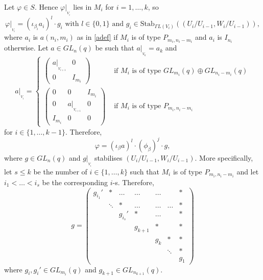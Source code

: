 Let $\varphi \in S$. Hence $\varphi|_{_{V_i}}$ lies in $M_i$ for $i=1, \ldots, k$, so $$\varphi|_{_{V_i}}= (\iota_{\beta_i} a_i)^l \cdot g_i \text{ with } l\in \{0,1\} \text{ and } g_i \in \mathrm{Stab}_{\Gamma L (V_i)}((U_{i}/U_{i-1}, W_{i}/U_{i-1})),$$
where $a_i$ is $a(n_i,m_i)$  as in \eqref{adef} if $M_i$ is of type $P_{m_i, n_i-m_i}$ and $a_i$ is $I_{n_i}$ otherwise. Let $a \in GL_n(q)$ be such that  $a|_{_{V_k}}=a_k$ and 
\begin{equation}
\label{adefGR}
a|_{_{V_i}}= \begin{cases}
\begin{pmatrix}
a|_{_{V_{i+1}}} & 0\\
0 & I_{m_{i}}
\end{pmatrix} &\text{ if } M_i \text{ is of type } GL_{m_i}(q) \oplus GL_{n_i-m_i}(q)\\
\begin{pmatrix}
0 & 0 & I_{m_i}\\
0 & a|_{_{V_{i+1}}} & 0\\
I_{m_i} & 0 & 0
\end{pmatrix} &\text{ if } M_i \text{ is of type } P_{m_i, n_i -m_i}
\end{cases}
\end{equation}
 for $i \in \{1, \ldots, k-1\}.$  Therefore, 
\begin{equation}
\label{GRvarphishape}
\varphi = (\iota_{\beta}a)^l \cdot (\phi_{\beta})^j \cdot g,
\end{equation}
where $g \in GL_n(q)$ and $g|_{_{V_i}}$ stabilises $(U_{i}/U_{i-1}, W_{i}/U_{i-1}).$ More specifically, let $s \le k$ be the number of $i \in \{1, \ldots, k\}$ such that $M_i$ is of type $P_{m_i, n_i-m_i}$ and let $i_1 < \ldots < i_s$ be the corresponding $i$-s. Therefore,
\begin{equation}
\label{GRguppdiag}
g= \begin{pmatrix}
g_{i_1} '&* &\ldots &\ldots &\ldots & &* \\
 & \ddots &* &\ldots &\ldots& \ldots &* \\
 & &g_{i_s}' &* &\ldots & &* \\
 & & &g_{k+1} &* & &* \\
 & & & & g_k &* & *\\
 & & & & & \ddots &*\\
& & & & & & g_1
\end{pmatrix}
\end{equation} 
where $g_i, g_i' \in GL_{m_i}(q)$ and $g_{k+1} \in GL_{n_{k+1}}(q).$



